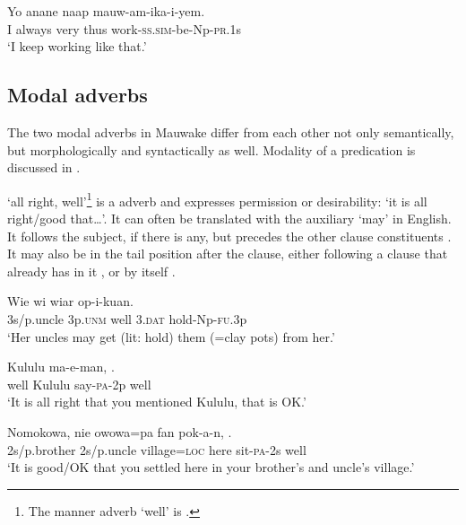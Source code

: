 \ea%
\label{ex:3:x509}
\gll Yo anane  naap mauw-am-ika-i-yem. \\
I always very thus work-\textsc{ss}.\textsc{sim}-be-Np-\textsc{pr}.1s\\
\glt`I  keep working like that.'
\z

\subsection{Modal adverbs}\label{sec:3.9.3}
{}
The two modal adverbs in Mauwake differ from each other not only semantically, but morphologically and syntactically as well. Modality of a predication is discussed in .

 `all right, well'\footnote{The manner adverb `well' is .} is a  adverb and expresses permission or desirability: `it is all right/good that{\dots}'. It can often be translated with the auxiliary `may' in English. It follows the subject, if there is any, but precedes the other clause constituents . It may also be in the tail position after the clause, either following a clause that already has  in it , or by itself . 

\ea%
\label{ex:3:x514}
\gll Wie wi  wiar op-i-kuan. \\
3s/p.uncle 3p.\textsc{unm} well 3.\textsc{dat} hold-Np-\textsc{fu}.3p\\
\glt`Her uncles may get (lit: hold) them (=clay pots) from her.' 
\z

\ea%
\label{ex:3:x515}
\gll {} Kululu ma-e-man, . \\
well Kululu say-\textsc{pa}-2p well\\
\glt`It is all right that you mentioned Kululu, that is OK.'
\z

\ea%
\label{ex:3:x516}
\gll Nomokowa, nie owowa=pa fan pok-a-n, . \\
2s/p.brother 2s/p.uncle village=\textsc{loc} here sit-\textsc{pa}-2s well\\
\glt`It is good/OK that you settled here in your brother's and uncle's village.'
\z

